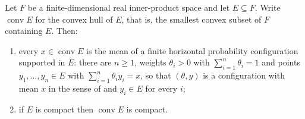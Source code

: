 \begin{lemma}
Let $F$ be a finite-dimensional real inner-product space and let $E\subseteq F$.
Write $\operatorname{conv}E$ for the convex hull of $E$, that is, the smallest
convex subset of $F$ containing $E$. Then:
\begin{enumerate}
\item every $x\in\operatorname{conv}E$ is the mean of a finite horizontal
probability configuration supported in $E$: there are $n\ge1$, weights
$\theta_i>0$ with $\sum_{i=1}^n\theta_i=1$ and points $y_1,\dots,y_n\in E$ with
$\sum_{i=1}^n\theta_iy_i=x$, so that $(\theta,y)$ is a configuration with mean
$x$ in the sense of  and $y_i\in E$ for every $i$;
\item if $E$ is compact then $\operatorname{conv}E$ is compact.
\end{enumerate}
\end{lemma}
